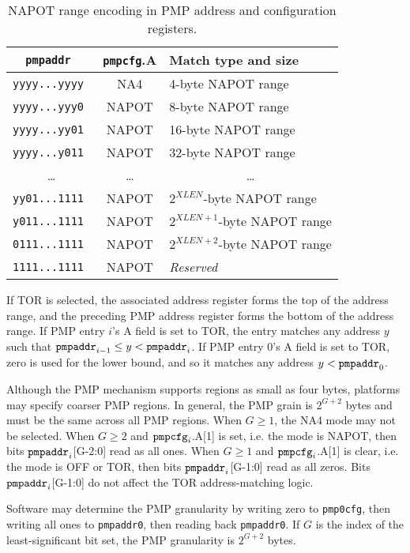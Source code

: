 \begin{table*}[h!]
\begin{center}
  \begin{tabular}{|c|c|l|}
  \hline
  \tt pmpaddr    & {\tt pmpcfg}.A & Match type and size \\
  \hline
  \tt yyyy...yyyy & NA4   & 4-byte NAPOT range \\
  \tt yyyy...yyy0 & NAPOT & 8-byte NAPOT range \\
  \tt yyyy...yy01 & NAPOT & 16-byte NAPOT range \\
  \tt yyyy...y011 & NAPOT & 32-byte NAPOT range \\
  \multicolumn{1}{|c|}{\ldots} &  \ldots  & \multicolumn{1}{|c|}{\ldots} \\
  \tt yy01...1111 & NAPOT & $2^{XLEN}$-byte NAPOT range \\
  \tt y011...1111 & NAPOT & $2^{XLEN+1}$-byte NAPOT range \\
  \tt 0111...1111 & NAPOT & $2^{XLEN+2}$-byte NAPOT range \\
  \tt 1111...1111 & NAPOT & {\em Reserved} \\
  \hline
  \end{tabular}
\end{center}
\caption{NAPOT range encoding in PMP address and configuration registers.}
\label{pmpcfg-napot}
\end{table*}

If TOR is selected, the associated address register forms the top of the
address range, and the preceding PMP address register forms the bottom of the
address range.  If PMP entry $i$'s A field is set to TOR, the entry matches
any address $y$ such that ${\tt pmpaddr}_{i-1}\leq y < {\tt pmpaddr}_i$.  If
PMP entry 0's A field is set to TOR, zero is used for the lower bound, and so
it matches any address $y < {\tt pmpaddr}_0$.

Although the PMP mechanism supports regions as small as four bytes, platforms
may specify coarser PMP regions. In general, the PMP grain is $2^{G+2}$ bytes
and must be the same across all PMP regions.  When $G \geq 1$, the NA4 mode
may not be selected.  When $G \geq 2$ and ${\tt pmpcfg}_i$.A[1] is set, i.e.
the mode is NAPOT, then bits ${\tt pmpaddr}_i$[G-2:0] read as all ones.  When
$G \geq 1$ and ${\tt pmpcfg}_i$.A[1] is clear, i.e. the mode is OFF or TOR,
then bits ${\tt pmpaddr}_i$[G-1:0] read as all zeros.  Bits ${\tt
pmpaddr}_i$[G-1:0] do not affect the TOR address-matching logic.

\begin{commentary}
Software may determine the PMP granularity by writing zero to {\tt pmp0cfg},
then writing all ones to {\tt pmpaddr0}, then reading back {\tt pmpaddr0}.
If $G$ is the index of the least-significant bit set,
the PMP granularity is $2^{G+2}$ bytes.
\end{commentary}

